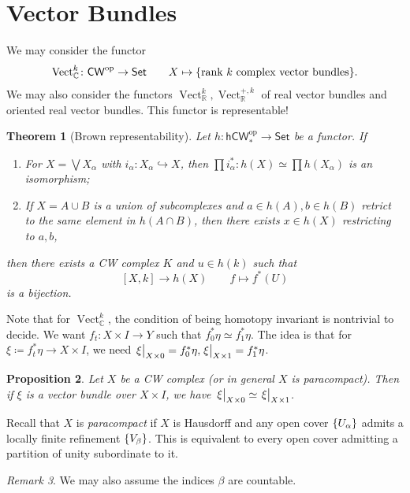 \documentclass[leqno, openany]{memoir}
\newtheorem{thm}{Theorem}[section]
\newtheorem{prop}[thm]{Proposition}
\theoremstyle{definition}
\theoremstyle{remark}
\newtheorem{rmk}[thm]{Remark}
\theoremstyle{plain}
\theoremstyle{definition}
\theoremstyle{remark}
\newcommand{\R}{\mathbb{R}}
\newcommand{\C}{\mathbb{C}}
\newcommand{\mr}[1]{\mathrm{#1}}
\newcommand{\ms}[1]{\mathsf{#1}}
\DeclareMathOperator{\Vect}{Vect}
\begin{document}
\section{Vector Bundles}%
\label{sec:vector_bundles}

We may consider the functor
\[ \mr{Vect}_{\C}^k \colon \ms{CW}^{\mr{op}} \to \ms{Set} \qquad X \mapsto \qty{\text{rank $k$ complex vector bundles}}. \]
We may also consider the functors $\Vect_{\R}^k, \Vect_{\R}^{+, k}$ of real vector bundles and oriented real vector bundles. This functor is representable!

\begin{thm}[Brown representability]
    Let $h \colon \ms{hCW}_*^{\mr{op}} \to \ms{Set}$ be a functor. If
    \begin{enumerate}
        \item For $X = \bigvee X_{\alpha}$ with $i_{\alpha} \colon X_{\alpha} \hookrightarrow X$, then $\prod i_{\alpha}^* \colon h(X) \simeq \prod h(X_{\alpha})$ is an isomorphism;
        \item If $X = A \cup B$ is a union of subcomplexes and $a \in h(A), b \in h(B)$ retrict to the same element in $h(A \cap B)$, then there exists $x \in h(X)$ restricting to $a,b$,
    \end{enumerate}
    then there exists a CW complex $K$ and $u \in h(k)$ such that 
    \[ [X,k] \to h(X) \qquad f \mapsto f^*(U) \]
    is a bijection.
\end{thm}

Note that for $\Vect_{\C}^k$, the condition of being homotopy invariant is nontrivial to decide. We want $f_t \colon X \times I \to Y$ such that $f_0^* \eta \simeq f_1^* \eta$. The idea is that for $\xi \coloneqq f_t^* \eta \to X \times I$, we need $\eval{\xi}_{X \times 0} = f_0^* \eta, \eval{\xi}_{X \times 1} = f_1^* \eta$.

\begin{prop}
    Let $X$ be a CW complex (or in general $X$ is paracompact). Then if $\xi$ is a vector bundle over $X \times I$, we have $\eval{\xi}_{X \times 0} \simeq \eval{\xi}_{X \times 1}$.
\end{prop}

Recall that $X$ is \textit{paracompact} if $X$ is Hausdorff and any open cover $\qty{U_{\alpha}}$ admits a locally finite refinement $\qty{V_{\beta}}$. This is equivalent to every open cover admitting a partition of unity subordinate to it.

\begin{rmk}
    We may also assume the indices $\beta$ are countable.
\end{rmk}
\end{document}
